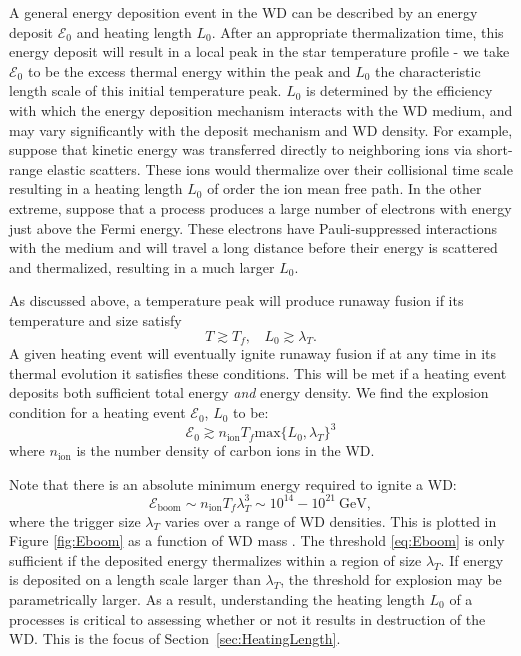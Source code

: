 \documentclass[twocolumn,showpacs,preprintnumbers,amsmath,amssymb,prd]{revtex4}
\newcommand{\GeV}{\text{GeV}}
\begin{document}
A general energy deposition event in the WD can be described by an energy deposit $\mathcal{E}_0$ and heating length $L_0$.  After an appropriate thermalization time, this energy deposit will result in a local peak in the star temperature profile - we take $\mathcal{E}_0$ to be the excess thermal energy within the peak and $L_0$ the characteristic length scale of this initial temperature peak.  $L_0$ is determined by the efficiency with which the energy deposition mechanism interacts with the WD medium, and may vary significantly with the deposit mechanism and WD density.  For example, suppose that kinetic energy was transferred directly to neighboring ions via short-range elastic scatters. These ions would thermalize over their collisional time scale resulting in a heating length $L_0$ of order the ion mean free path. In the other extreme, suppose that a process produces a large number of electrons with energy just above the Fermi energy.  These electrons have Pauli-suppressed interactions with the medium and will travel a long distance before their energy is scattered and thermalized, resulting in a much larger $L_0$.

As discussed above, a temperature peak will produce runaway fusion if its temperature and size satisfy
\begin{equation}
\label{eq:runaway}
  T \gtrsim T_f, ~~~~ L_0 \gtrsim \lambda_T.
\end{equation}
A given heating event will eventually ignite runaway fusion if at any time in its thermal evolution it satisfies these conditions.  This will be met if a heating event deposits both sufficient total energy \emph{and} energy density.  We find the explosion condition for a heating event $\mathcal{E}_0$, $L_0$ to be:
\begin{equation}
\label{eq:boom}
  \mathcal{E}_0 \gtrsim n_\text{ion} T_f \text{max}\{L_0, \lambda_T\}^3
\end{equation}
where $n_\text{ion}$ is the number density of carbon ions in the WD.

Note that there is an absolute minimum energy required to ignite a WD:
\begin{equation}
\label{eq:Eboom}
\mathcal{E}_{\text{boom}} \sim n_\text{ion} T_f \lambda_T^3 \sim 10^{14} - 10^{21} ~\GeV,
\end{equation}
where the trigger size $\lambda_T$ varies over a range of WD densities.  This is plotted in Figure \ref{fig:Eboom} as a function of WD mass \cite{website}.  The threshold \eqref{eq:Eboom} is only sufficient if the deposited energy thermalizes within a region of size $\lambda_T$.  If energy is deposited on a length scale larger than $\lambda_T$, the threshold for explosion may be parametrically larger.  As a result, understanding the heating length $L_0$ of a processes is critical to assessing whether or not it results in destruction of the WD. This is the focus of Section~\ref{sec:HeatingLength}.
\end{document}
